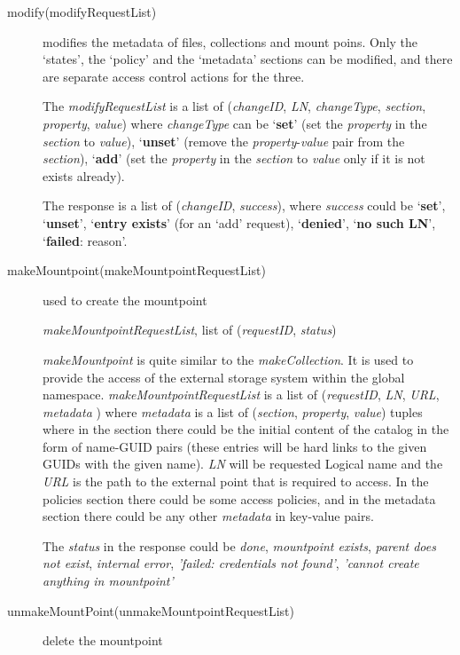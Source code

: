 \documentclass{book}
\begin{document}
\begin{description}
    \item[modify(modifyRequestList)] modifies the metadata of files, collections and mount poins. Only the `states', the `policy' and the `metadata' sections can be modified, and there are separate access control actions for the three.
    
    The \emph{modifyRequestList} is a list of (\emph{changeID}, \emph{LN}, \emph{changeType}, \emph{section}, \emph{property}, \emph{value}) where \emph{changeType} can be `\textbf{set}' (set the \emph{property} in the \emph{section} to \emph{value}), `\textbf{unset}' (remove the \emph{property}-\emph{value} pair from the \emph{section}), `\textbf{add}' (set the \emph{property} in the \emph{section} to \emph{value} only if it is not exists already). 

    The response is a list of (\emph{changeID}, \emph{success}), where \emph{success} could be  `\textbf{set}', `\textbf{unset}', `\textbf{entry exists}' (for an `add' request), `\textbf{denied}', `\textbf{no such LN}', `\textbf{failed}: reason'.
   
    \item[makeMountpoint(makeMountpointRequestList)] used to create the mountpoint

    \emph{makeMountpointRequestList}, list of (\emph{requestID}, \emph{status})

    \emph{makeMountpoint} is quite similar to the \emph{makeCollection}. It is used to provide the access of the external storage system within the global namespace. \emph{makeMountpointRequestList} is a list of (\emph{requestID}, \emph{LN}, \emph{URL}, \emph{metadata} ) where \emph{metadata} is a list of (\emph{section}, \emph{property}, \emph{value}) tuples where in the section there could be the initial content of the catalog in the form of name-GUID pairs (these entries will be hard links to the given GUIDs with the given name). \emph{LN} will be requested Logical name and the \emph{URL} is the path to the external point that is required to access. In the policies section there could be some access policies, and in the metadata section there could be any other \emph{metadata} in key-value pairs. 

    The \emph{status} in the response could be \emph{done}, \emph{mountpoint exists}, \emph{parent does not exist}, \emph{internal error}, \emph{'failed: credentials not found'}, \emph{'cannot create anything in mountpoint'}

    \item[unmakeMountPoint(unmakeMountpointRequestList)] delete the mountpoint


\end{description}
\end{document}
